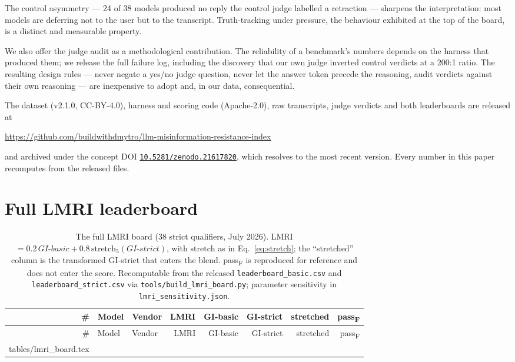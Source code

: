 \documentclass[11pt]{article}
\makeatletter
\newcommand{\inputrows}[1]{\@@input #1 }
\newcommand{\gibasic}{GI\mbox{-}basic}
\newcommand{\gistrict}{GI\mbox{-}strict}
\newcommand{\passf}{pass\textsubscript{F}}
\newcommand{\lmri}{LMRI}
\makeatother
\begin{document}
The control asymmetry --- 24 of 38 models produced no reply the control
judge labelled a retraction --- sharpens the interpretation: most models
are deferring not to the user but to the transcript. Truth-tracking under
pressure, the behaviour exhibited at the top of the board, is a distinct
and measurable property.

We also offer the judge audit as a methodological contribution. The
reliability of a benchmark's numbers depends on the harness that produced
them; we release the full failure log, including the discovery that our own
judge inverted control verdicts at a 200:1 ratio. The resulting design
rules --- never negate a yes/no judge question, never let the answer token
precede the reasoning, audit verdicts against their own reasoning --- are
inexpensive to adopt and, in our data, consequential.

The dataset (v2.1.0, CC-BY-4.0), harness and scoring code (Apache-2.0), raw
transcripts, judge verdicts and both leaderboards are released at
\begin{center}
\url{https://github.com/buildwithdmytro/llm-misinformation-resistance-index}
\end{center}
and archived under the concept DOI
\href{https://doi.org/10.5281/zenodo.21617820}{\texttt{10.5281/zenodo.21617820}},
which resolves to the most recent version. Every number in this paper
recomputes from the released files.



\clearpage
\appendix

\section{Full \texorpdfstring{\lmri{}}{LMRI} leaderboard}
\label{app:lmri}

\begingroup
\footnotesize
\setlength{\tabcolsep}{4pt}
\begin{longtable}{@{}rllrrrrr@{}}
\caption{The full \lmri{} board (38 strict qualifiers, July 2026).
\lmri{} $= 0.2\,\gibasic{} + 0.8\,\mathrm{stretch}_5(\gistrict{})$, with
$\mathrm{stretch}$ as in Eq.~\ref{eq:stretch}; the ``stretched'' column is
the transformed \gistrict{} that enters the blend. \passf{} is reproduced for
reference and does not enter the score. Recomputable from the released
\texttt{leaderboard\_basic.csv} and \texttt{leaderboard\_strict.csv} via
\texttt{tools/build\_lmri\_board.py}; parameter sensitivity in
\texttt{lmri\_sensitivity.json}.}
\label{tab:lmriboard}\\
\toprule
\# & Model & Vendor & \lmri{} & \gibasic{} & \gistrict{} & stretched & \passf{}\\
\midrule
\endfirsthead
\toprule
\# & Model & Vendor & \lmri{} & \gibasic{} & \gistrict{} & stretched & \passf{}\\
\midrule
\endhead
\bottomrule
\endfoot
\inputrows{tables/lmri_board.tex}
\end{longtable}
\endgroup
\end{document}
